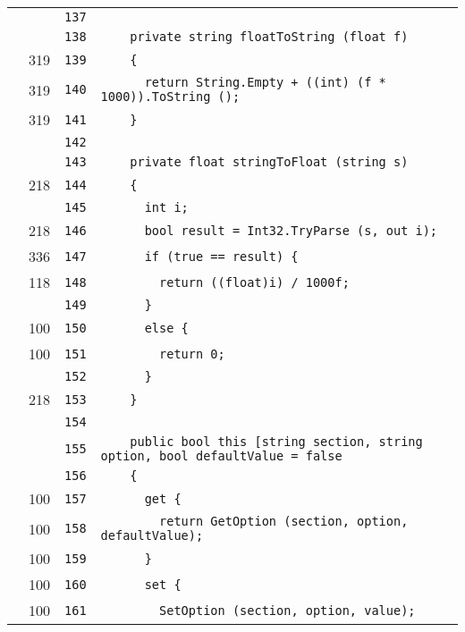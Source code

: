 \documentclass[a4paper,10pt]{article}
\begin{document}
\begin{longtable}[l]{lrrl}
\cellcolor{gray} &  & \verb~137~ & \verb~~\\
\cellcolor{gray} &  & \verb~138~ & \verb~    private string floatToString (float f)~\\
\cellcolor{green} & 319 & \verb~139~ & \verb~    {~\\
\cellcolor{green} & 319 & \verb~140~ & \verb~      return String.Empty + ((int) (f * 1000)).ToString ();~\\
\cellcolor{green} & 319 & \verb~141~ & \verb~    }~\\
\cellcolor{gray} &  & \verb~142~ & \verb~~\\
\cellcolor{gray} &  & \verb~143~ & \verb~    private float stringToFloat (string s)~\\
\cellcolor{green} & 218 & \verb~144~ & \verb~    {~\\
\cellcolor{gray} &  & \verb~145~ & \verb~      int i;~\\
\cellcolor{green} & 218 & \verb~146~ & \verb~      bool result = Int32.TryParse (s, out i);~\\
\cellcolor{green} & 336 & \verb~147~ & \verb~      if (true == result) {~\\
\cellcolor{green} & 118 & \verb~148~ & \verb~        return ((float)i) / 1000f;~\\
\cellcolor{gray} &  & \verb~149~ & \verb~      }~\\
\cellcolor{green} & 100 & \verb~150~ & \verb~      else {~\\
\cellcolor{green} & 100 & \verb~151~ & \verb~        return 0;~\\
\cellcolor{gray} &  & \verb~152~ & \verb~      }~\\
\cellcolor{green} & 218 & \verb~153~ & \verb~    }~\\
\cellcolor{gray} &  & \verb~154~ & \verb~~\\
\cellcolor{gray} &  & \verb~155~ & \verb~    public bool this [string section, string option, bool defaultValue = false~\\
\cellcolor{gray} &  & \verb~156~ & \verb~    {~\\
\cellcolor{green} & 100 & \verb~157~ & \verb~      get {~\\
\cellcolor{green} & 100 & \verb~158~ & \verb~        return GetOption (section, option, defaultValue);~\\
\cellcolor{green} & 100 & \verb~159~ & \verb~      }~\\
\cellcolor{green} & 100 & \verb~160~ & \verb~      set {~\\
\cellcolor{green} & 100 & \verb~161~ & \verb~        SetOption (section, option, value);~\\

\end{longtable}
\end{document}
